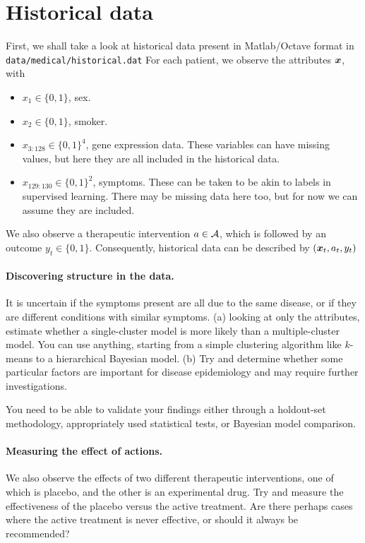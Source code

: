 
\section{Historical data}

First, we shall take a look at historical data present in Matlab/Octave format in
\texttt{data/medical/historical.dat}
For each patient, we observe the attributes $\bx$, with
\begin{itemize}
\item $x_1 \in \{0,1\}$, sex.
\item $x_2 \in \{0,1\}$, smoker.
\item $x_{3:128} \in \{0,1\}^4$, gene expression data. These variables can have missing values, but here they are all included in the historical data.
\item $x_{129:130} \in \{0,1\}^2$, symptoms. These can be taken to be akin to labels in supervised learning. There may be missing data here too, but for now we can assume they are included.
\end{itemize}
We also observe a therapeutic intervention $a \in {\mathcal{A}}$, which is followed by an outcome $y_t \in \{0,1\}$. Consequently, historical data can be described by $(\bx_t, a_t, y_t)$

\paragraph{Discovering structure in the data.}
It is uncertain if the symptoms present are all due to the same disease, or if they are different conditions with similar symptoms. (a) looking at only the attributes, estimate whether a single-cluster model is more likely than a multiple-cluster model. You can use anything, starting from a simple clustering algorithm like $k$-means to a hierarchical Bayesian model. (b) Try and determine whether some particular factors are important for disease epidemiology and may require further investigations.

You need to be able to validate your findings either through a holdout-set methodology, appropriately used statistical tests, or Bayesian model comparison.

\paragraph{Measuring the effect of actions.}
We also observe the effects of two different therapeutic interventions, one of which is placebo, and the other is an experimental drug. Try and measure the effectiveness of the placebo versus the active treatment. Are there perhaps cases where the active treatment is never effective, or should it always be recommended?













